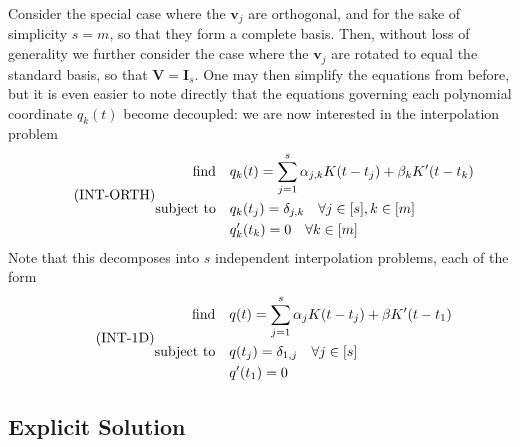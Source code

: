 \documentclass[11pt]{article}
\newcommand{\HS}{\hspace{3.5mm}}
\newcommand{\bV}{\bm V}
\newcommand{\bv}{\bm v}
\begin{document}
Consider the special case where the $\bv_j$ are orthogonal, and for the sake of simplicity $s = m$, so that they form a complete basis.
Then, without loss of generality we further consider the case where the $\bv_j$ are rotated to equal the standard basis, so that $\bV = \bm I_s$.
One may then simplify the equations from before, but it is even easier to note directly that the equations governing each polynomial coordinate $q_k(t)$ become decoupled: we are now interested in the interpolation problem
\begin{equation}
    \tag{INT-ORTH}
    \begin{aligned}
  \text{find} &\HS q_k(t) = \sum_{j = 1}^s \alpha_{j, k} K(t - t_j) + \beta_kK^\prime(t - t_k) \\
  \text{subject to} &\HS q_k(t_j) = \delta_{j, k} \HS \forall j \in [s], k \in [m] \\
  &\HS q_k^\prime(t_k) = 0 \HS \forall k \in [m]
\end{aligned}
\end{equation}
Note that this decomposes into $s$ independent interpolation problems, each of the form
\begin{equation}
    \tag{INT-1D}
    \begin{aligned}
  \text{find} &\HS q(t) = \sum_{j = 1}^{s} \alpha_j K(t - t_j) + \beta K^\prime(t - t_1) \\
  \text{subject to}
              &\HS q(t_j) = \delta_{1,j} \HS \forall j \in [s] \\
              &\HS q^\prime(t_1) = 0
          \end{aligned}
\end{equation}

\subsection{Explicit Solution}
\end{document}
